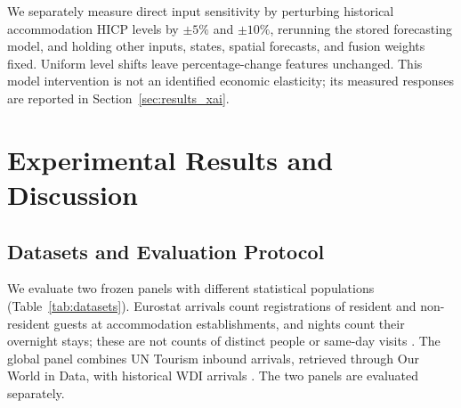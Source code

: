 \documentclass[sigconf]{acmart}
\begin{document}
We separately measure direct input sensitivity by perturbing historical accommodation HICP levels by $\pm5\%$ and $\pm10\%$, rerunning the stored forecasting model, and holding other inputs, states, spatial forecasts, and fusion weights fixed. Uniform level shifts leave percentage-change features unchanged. This model intervention is not an identified economic elasticity; its measured responses are reported in Section~\ref{sec:results_xai}.

\section{Experimental Results and Discussion}
\label{sec:results}

\subsection{Datasets and Evaluation Protocol}
\label{sec:experimental_setup}
We evaluate two frozen panels with different statistical populations (Table~\ref{tab:datasets}). Eurostat arrivals count registrations of resident and non-resident guests at accommodation establishments, and nights count their overnight stays; these are not counts of distinct people or same-day visits \cite{eurostat_tourism_release,eurostat_tourism_scope}. The global panel combines UN Tourism inbound arrivals, retrieved through Our World in Data, with historical WDI arrivals \cite{un_tourism_database,owid_tourist_arrivals,worldbank_arrivals_metadata}. The two panels are evaluated separately.
\end{document}
